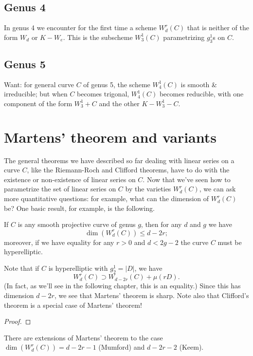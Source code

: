 \subsection{Genus 4}

In genus 4 we encounter for the first time a scheme $W^r_d(C)$ that is neither of the form $W_d$ or $K - W_e$. This is the subscheme $W^1_3(C)$ parametrizing $g^1_3$s on $C$.

\subsection{Genus 5}

Want: for general curve $C$ of genus 5, the scheme $W^1_4(C)$ is smooth \& irreducible; but when $C$ becomes trigonal, $W^1_4(C)$ becomes reducible, with one component of the form $W^1_3 + C$ and the other $K - W^1_3 - C$.

\section{Martens' theorem and variants}

The general theorems we have described so far dealing with linear series on a curve $C$, like the Riemann-Roch and Clifford theorems, have to do with the existence or non-existence of linear series on $C$. Now that we've seen how to parametrize the set of linear series on $C$ by the varieties $W^r_d(C)$, we can ask more quantitative questions: for example, what can the dimension of $W^r_d(C)$ be? One basic result, for example, is the following.

\begin{theorem}
If $C$ is any smooth projective curve of genus $g$, then for any $d$ and $g$ we have
$$
\dim(W^r_d(C)) \leq d-2r;
$$
moreover, if we have equality for any $r > 0$ and $d < 2g-2$ the curve $C$ must be hyperelliptic.
\end{theorem}

Note that if $C$ is hyperelliptic with $g^1_2 = |D|$, we have
$$
W^r_d(C) \supset W_{d-2r}(C) + \mu(rD).
$$
(In fact, as we'll see in the following chapter, this is an equality.) Since this has dimension $d-2r$, we see that Martens' theorem is sharp. Note also that Clifford's theorem is a special case of Martens' theorem!

\begin{proof}

\end{proof}

There are extensions of Martens' theorem to the case $\dim(W^r_d(C)) = d-2r-1$ (Mumford) and $d-2r-2$ (Keem).

